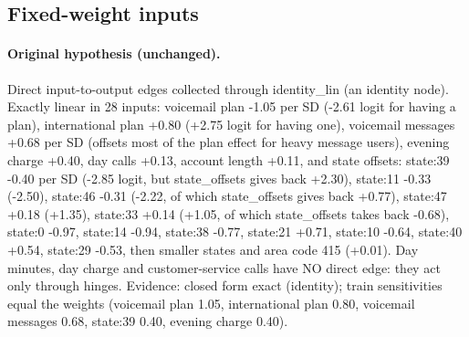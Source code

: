 \documentclass[a4paper,10pt]{article}
\newif\ifreviewmarks
\newcommand{\reviewrule}{\noindent{\color{BrickRed}\rule{\linewidth}{0.8pt}}}
\newenvironment{drafted}[1][]{%
  \ifreviewmarks\par\addvspace{\medskipamount}\reviewrule\par\nopagebreak
  \noindent{\color{BrickRed}\sffamily\footnotesize\textbf{Thesis Draft}\quad #1\hfill review}\par\nopagebreak\smallskip\fi}{%
  \ifreviewmarks\par\smallskip\noindent{\color{BrickRed}\sffamily\footnotesize end of thesis draft}\par\nopagebreak\reviewrule\par\medskip\fi}
\begin{document}
\begin{drafted}[plain-language layer: churn100-s4-c3]
\subsection{Fixed-weight inputs}\label{tech:ann82}
\paragraph{Original hypothesis (unchanged).} Direct input-to-output edges collected through identity\_\allowbreak{}lin (an identity node). Exactly linear in 28 inputs: voicemail plan -1.05 per SD (-2.61 logit for having a plan), international plan +0.80 (+2.75 logit for having one), voicemail messages +0.68 per SD (offsets most of the plan effect for heavy message users), evening charge +0.40, day calls +0.13, account length +0.11, and state offsets: state:39 -0.40 per SD (-2.85 logit, but state\_\allowbreak{}offsets gives back +2.30), state:11 -0.33 (-2.50), state:46 -0.31 (-2.22, of which state\_\allowbreak{}offsets gives back +0.77), state:47 +0.18 (+1.35), state:33 +0.14 (+1.05, of which state\_\allowbreak{}offsets takes back -0.68), state:0 -0.97, state:14 -0.94, state:38 -0.77, state:21 +0.71, state:10 -0.64, state:40 +0.54, state:29 -0.53, then smaller states and area code 415 (+0.01). Day minutes, day charge and customer-service calls have NO direct edge: they act only through hinges. Evidence: closed form exact (identity); train sensitivities equal the weights (voicemail plan 1.05, international plan 0.80, voicemail messages 0.68, state:39 0.40, evening charge 0.40).

\end{drafted}
\end{document}
